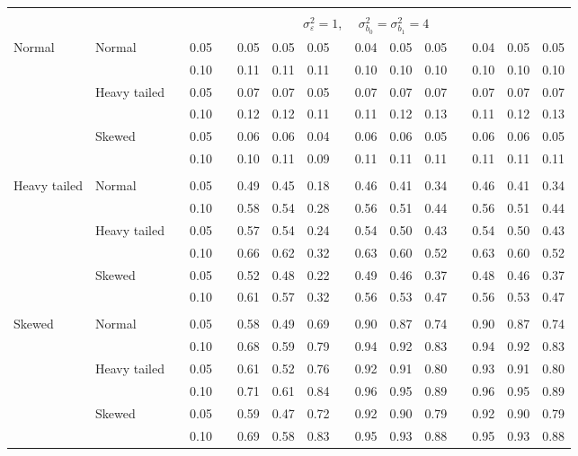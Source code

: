 \begin{table}[ht]
\begin{scriptsize}
\begin{center}
\begin{tabular}{ll p{.1cm} c p{.1cm} rrr p{.1cm} rrr p{.1cm} rrr}
&&&&&&&&&&&&&&&\\
& && && \multicolumn{9}{c}{$\sigma_{\varepsilon}^2 = 1$, \ \ $\sigma_{b_0}^2 = \sigma_{b_1}^2 = 4$} \\ \cline{6-16}

\rowcolor{gray!20} Normal       & Normal       && 0.05 &&  0.05 & 0.05 & 0.05 && 0.04 & 0.05 & 0.05 && 0.04 & 0.05 & 0.05 \\ 
\rowcolor{gray!20}              &              && 0.10 &&  0.11 & 0.11 & 0.11 && 0.10 & 0.10 & 0.10 && 0.10 & 0.10 & 0.10 \\ 
\rowcolor{gray!20}              & Heavy tailed && 0.05 &&  0.07 & 0.07 & 0.05 && 0.07 & 0.07 & 0.07 && 0.07 & 0.07 & 0.07 \\ 
\rowcolor{gray!20}              &              && 0.10 &&  0.12 & 0.12 & 0.11 && 0.11 & 0.12 & 0.13 && 0.11 & 0.12 & 0.13 \\ 
\rowcolor{gray!20}              & Skewed       && 0.05 &&  0.06 & 0.06 & 0.04 && 0.06 & 0.06 & 0.05 && 0.06 & 0.06 & 0.05 \\ 
\rowcolor{gray!20}              &              && 0.10 &&  0.10 & 0.11 & 0.09 && 0.11 & 0.11 & 0.11 && 0.11 & 0.11 & 0.11 \\
              &&&&&&&&&&&&&&&\\
 Heavy tailed & Normal       && 0.05 &&  0.49 & 0.45 & 0.18 && 0.46 & 0.41 & 0.34 && 0.46 & 0.41 & 0.34 \\ 
              &              && 0.10 &&  0.58 & 0.54 & 0.28 && 0.56 & 0.51 & 0.44 && 0.56 & 0.51 & 0.44 \\ 
              & Heavy tailed && 0.05 &&  0.57 & 0.54 & 0.24 && 0.54 & 0.50 & 0.43 && 0.54 & 0.50 & 0.43 \\ 
              &              && 0.10 &&  0.66 & 0.62 & 0.32 && 0.63 & 0.60 & 0.52 && 0.63 & 0.60 & 0.52 \\ 
              & Skewed       && 0.05 &&  0.52 & 0.48 & 0.22 && 0.49 & 0.46 & 0.37 && 0.48 & 0.46 & 0.37 \\ 
              &              && 0.10 &&  0.61 & 0.57 & 0.32 && 0.56 & 0.53 & 0.47 && 0.56 & 0.53 & 0.47 \\ 
              &&&&&&&&&&&&&&&\\
 Skewed       & Normal       && 0.05 &&  0.58 & 0.49 & 0.69 && 0.90 & 0.87 & 0.74 && 0.90 & 0.87 & 0.74 \\ 
              &              && 0.10 &&  0.68 & 0.59 & 0.79 && 0.94 & 0.92 & 0.83 && 0.94 & 0.92 & 0.83 \\ 
              & Heavy tailed && 0.05 &&  0.61 & 0.52 & 0.76 && 0.92 & 0.91 & 0.80 && 0.93 & 0.91 & 0.80 \\ 
              &              && 0.10 &&  0.71 & 0.61 & 0.84 && 0.96 & 0.95 & 0.89 && 0.96 & 0.95 & 0.89 \\ 
              & Skewed       && 0.05 &&  0.59 & 0.47 & 0.72 && 0.92 & 0.90 & 0.79 && 0.92 & 0.90 & 0.79 \\ 
              &              && 0.10 &&  0.69 & 0.58 & 0.83 && 0.95 & 0.93 & 0.88 && 0.95 & 0.93 & 0.88 \\ 



\end{tabular}
\end{center}
\end{scriptsize}
\end{table}

